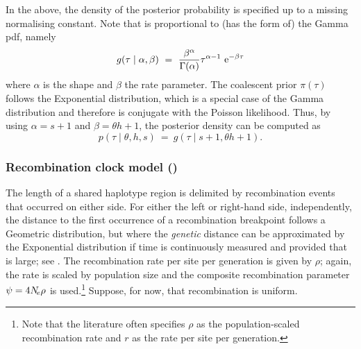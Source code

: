 In the above, the density of the posterior probability is specified up to a missing normalising constant.
Note that  is proportional to (has the form of) the Gamma \gls{pdf}, namely
\begin{equation*}
	g(\tau\mid\alpha,\beta)~=~\frac{\beta^\alpha}{\Gamma(\alpha)}\tau^{\alpha - 1}\,\,\mathrm{e}^{-\beta\tau}
\end{equation*}
where $\alpha$ is the shape and $\beta$ the rate parameter.
The coalescent prior $\pi(\tau)$ follows the Exponential distribution, which is a special case of the Gamma distribution and therefore is conjugate with the Poisson likelihood.
Thus, by using ${\alpha = s+1}$ and ${\beta = \theta h+1}$, the posterior density can be computed as
\begin{equation}
	p(\tau \mid \theta,h,s)~=~g(\tau\mid s+1, \theta h+1)\text{.}
\end{equation}




%
\subsubsection{Recombination clock model (\ClockR)}\label{sec:rec_clock}
%


The length of a shared haplotype region is delimited by  recombination events that occurred on either side.
For either the left or right-hand side, independently, the distance to the first occurrence of a recombination breakpoint follows a Geometric distribution, but where the \emph{genetic} distance can be approximated by the Exponential distribution if time is continuously measured and provided that \Ne is large; \eg see \citet{hein2004gene}.
The recombination rate per site per generation is given by $\rho$; again, the rate is scaled by population size and the composite recombination parameter ${\psi = 4 N_{\!e} \rho}$ is used.\footnote{Note that the literature often specifies $\rho$ as the population-scaled recombination rate and $r$ as the rate per site per generation.}
Suppose, for now, that recombination is uniform.

